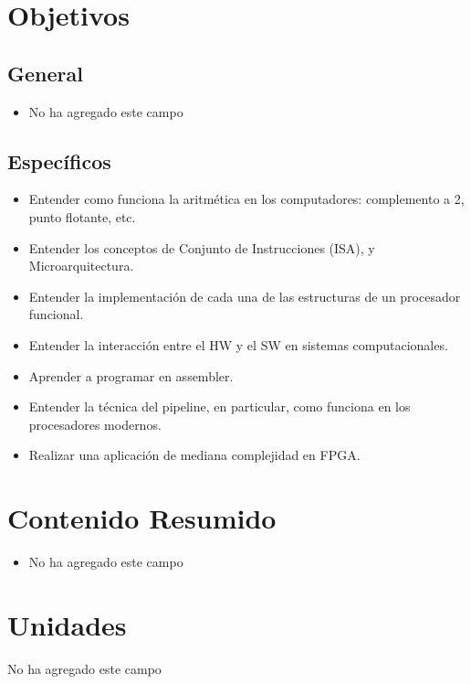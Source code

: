 \documentclass[11pt]{article}
\begin{document}
\section*{Objetivos}

\subsection*{General}

\begin{itemize}
\item No ha agregado este campo 
\end{itemize}

\subsection*{Específicos}

\begin{itemize}
\item Entender como funciona la aritmética en los computadores: complemento a 2, punto flotante, etc. \item Entender los conceptos de Conjunto de Instrucciones (ISA), y Microarquitectura. \item Entender la implementación de cada una de las estructuras de un procesador funcional. \item Entender la interacción entre el HW y el SW en sistemas computacionales. \item Aprender a programar en assembler. \item Entender la técnica del pipeline, en particular, como funciona en los procesadores modernos. \item Realizar una aplicación de mediana complejidad en FPGA. 
\end{itemize}

\section*{Contenido Resumido}

\begin{itemize}
\item No ha agregado este campo 
\end{itemize}

\section*{Unidades}
\noindent 
No ha agregado este campo
\end{document}

